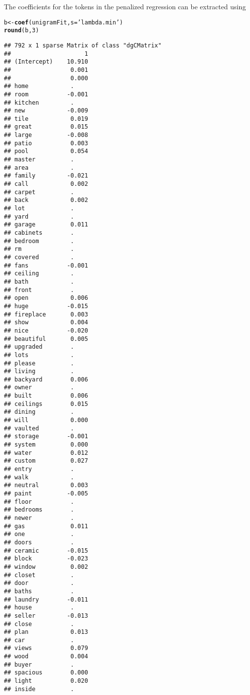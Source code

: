 \documentclass{article}\usepackage[]{graphicx}\usepackage[]{color}
\makeatletter
\newcommand{\hlnum}[1]{\textcolor[rgb]{0.686,0.059,0.569}{#1}}%
\newcommand{\hlstr}[1]{\textcolor[rgb]{0.192,0.494,0.8}{#1}}%
\newcommand{\hlstd}[1]{\textcolor[rgb]{0.345,0.345,0.345}{#1}}%
\newcommand{\hlkwb}[1]{\textcolor[rgb]{0.69,0.353,0.396}{#1}}%
\newcommand{\hlkwc}[1]{\textcolor[rgb]{0.333,0.667,0.333}{#1}}%
\newcommand{\hlkwd}[1]{\textcolor[rgb]{0.737,0.353,0.396}{\textbf{#1}}}%
\newenvironment{kframe}{%
 \def\at@end@of@kframe{}%
 \ifinner\ifhmode%
  \def\at@end@of@kframe{\end{minipage}}%
  \begin{minipage}{\columnwidth}%
 \fi\fi%
 \def\FrameCommand##1{\hskip\@totalleftmargin \hskip-\fboxsep
 \colorbox{shadecolor}{##1}\hskip-\fboxsep
     \hskip-\linewidth \hskip-\@totalleftmargin \hskip\columnwidth}%
 \MakeFramed {\advance\hsize-\width
   \@totalleftmargin\z@ \linewidth\hsize
   \@setminipage}}%
 {\par\unskip\endMakeFramed%
 \at@end@of@kframe}
\newenvironment{knitrout}{}{} %
\makeatother
\begin{document}
The coefficients for the tokens in the penalized regression can be extracted using
\begin{knitrout}\footnotesize
{}\color{fgcolor}\begin{kframe}
\begin{alltt}
\hlstd{b} \hlkwb{<-} \hlkwd{coef}\hlstd{(unigramFit ,} \hlkwc{s}\hlstd{=}\hlstr{'lambda.min'}\hlstd{)}
\hlkwd{round}\hlstd{(b ,} \hlnum{3}\hlstd{)}
\end{alltt}
\begin{verbatim}
## 792 x 1 sparse Matrix of class "dgCMatrix"
##                     1
## (Intercept)    10.910
##                 0.001
##                 0.000
## home            .    
## room           -0.001
## kitchen         .    
## new            -0.009
## tile            0.019
## great           0.015
## large          -0.008
## patio           0.003
## pool            0.054
## master          .    
## area            .    
## family         -0.021
## call            0.002
## carpet          .    
## back            0.002
## lot             .    
## yard            .    
## garage          0.011
## cabinets        .    
## bedroom         .    
## rm              .    
## covered         .    
## fans           -0.001
## ceiling         .    
## bath            .    
## front           .    
## open            0.006
## huge           -0.015
## fireplace       0.003
## show            0.004
## nice           -0.020
## beautiful       0.005
## upgraded        .    
## lots            .    
## please          .    
## living          .    
## backyard        0.006
## owner           .    
## built           0.006
## ceilings        0.015
## dining          .    
## will            0.000
## vaulted         .    
## storage        -0.001
## system          0.000
## water           0.012
## custom          0.027
## entry           .    
## walk            .    
## neutral         0.003
## paint          -0.005
## floor           .    
## bedrooms        .    
## newer           .    
## gas             0.011
## one             .    
## doors           .    
## ceramic        -0.015
## block          -0.023
## window          0.002
## closet          .    
## door            .    
## baths           .    
## laundry        -0.011
## house           .    
## seller         -0.013
## close           .    
## plan            0.013
## car             .    
## views           0.079
## wood            0.004
## buyer           .    
## spacious        0.000
## light           0.020
## inside          .    

\end{verbatim}
\end{kframe}
\end{knitrout}
\end{document}
